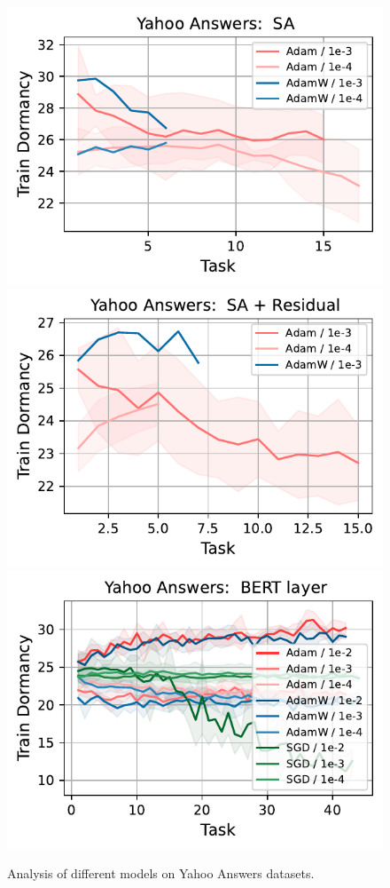 \begin{figure}[htb!]
{    \includegraphics[width=\textwidth]{figs/Dormancy/nlp/attention/yahoo_answers_40.pdf}
    \includegraphics[width=\textwidth]{figs/Dormancy/nlp/attention_residual/yahoo_answers_40.pdf}
    \includegraphics[width=\textwidth]{figs/Dormancy/nlp/bert_layer/yahoo_answers_40.pdf}
    }
    \caption{Analysis of different models on Yahoo Answers datasets.}
    \label{fig:yahoo_models_analysis}
\end{figure}



